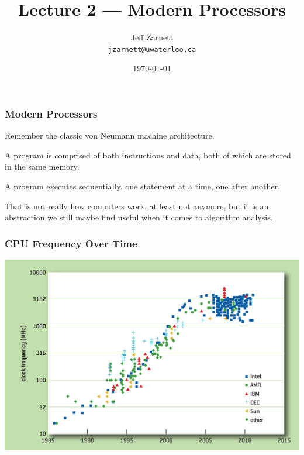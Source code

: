 

\title{Lecture 2 --- Modern Processors }

\author{Jeff Zarnett \\ \small \texttt{jzarnett@uwaterloo.ca}}
\date{\today}




\begin{frame}
  \titlepage

\end{frame}



\begin{frame}
\frametitle{Modern Processors}


Remember the classic von Neumann machine architecture. 

A program is comprised of both instructions and data, both of which are stored in the same memory. 

A program executes sequentially, one statement at a time, one after another.

 That is not really how computers work, at least not anymore, but it is an abstraction we still maybe find useful when it comes to algorithm analysis.

\end{frame}



\begin{frame}
\frametitle{CPU Frequency Over Time}


\begin{center}
\includegraphics[width=\textwidth]{images/cpu-frequency}
\end{center}

\end{frame}



